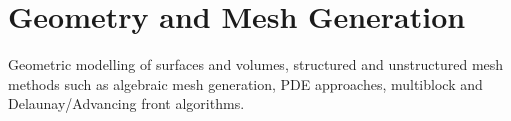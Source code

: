 \chapter{Geometry and Mesh Generation}
Geometric modelling of surfaces and volumes, structured and unstructured mesh methods such as algebraic mesh generation, PDE approaches, multiblock and Delaunay/Advancing front algorithms.
